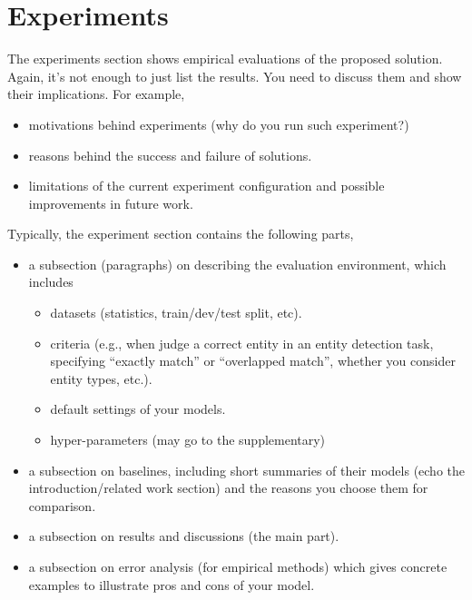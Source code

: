 \section{Experiments}

The experiments section shows empirical evaluations of the proposed solution.
Again, it's not enough to just list the results.
You need to discuss them and show their implications.
For example, 
\begin{itemize}
    \item motivations behind experiments (why do you run such experiment?)
    \item reasons behind the success and failure of solutions.
    \item limitations of the current experiment configuration and 
        possible improvements in future work.
\end{itemize}

Typically, the experiment section contains the following parts,
\begin{itemize}
    \item a subsection (paragraphs) on describing the evaluation environment,
        which includes 
    \begin{itemize}
        \item datasets (statistics, train/dev/test split, etc).
        \item criteria (e.g., when judge a correct entity in an entity detection task, 
            specifying ``exactly match'' or ``overlapped match'', 
            whether you consider entity types, etc.).
        \item default settings of your models.
        \item hyper-parameters (may go to the supplementary)
    \end{itemize}
    \item a subsection on baselines, including 
        short summaries of their models (echo the introduction/related work section)
        and the reasons you choose them for comparison.
    \item a subsection on results and discussions (the main part).
    \item a subsection on error analysis (for empirical methods) 
        which gives concrete examples to illustrate pros and cons of your model.
\end{itemize}




 

